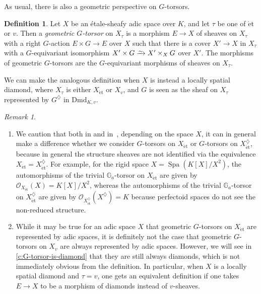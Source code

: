 \documentclass[10pt,a4paper]{article}
\theoremstyle{definition}
\newtheorem{Definition}[thm]{Definition}
\theoremstyle{remark}
\newtheorem{Remark}[thm]{Remark}
\newcommand*{\lowsim}{\vbox to 0pt{\vss\hbox{$\scriptstyle\sim$}\vskip-2pt}}
\newcommand*{\isomarrow}{\xrightarrow{\lowsim}}
\newcommand{\G}{\mathbb{G}}
\renewcommand{\O}{\mathcal{O}}
\newcommand{\Spa}{\operatorname{Spa}}
\newcommand{\et}{{\operatorname{\acute{e}t}}}
\newcommand{\Dmd}{\mathrm{Dmd}}
\numberwithin{equation}{section}
\begin{document}
As usual, there is also a geometric perspective on $G$-torsors. 

\begin{Definition}\label{d:geom-G-torsor} Let $X$ be an \'etale-sheafy adic space over $K$, and let $\tau$ be one of $\et$ or $v$.
	Then a \emph{geometric $G$-torsor} on $X_{\tau}$ is a morphism $E\to X$ of sheaves on $X_\tau$ with a right $G$-action $E\times G\to E$ over $X$ such that there is a cover $X'\to X$ in $X_\tau$ with a $G$-equivariant isomorphism $X'\times G\isomarrow X'\times_XG$ over $X'$. The morphisms of geometric $G$-torsors are the $G$-equivariant morphisms of sheaves on $X_\tau$.
	
	We can make the analogous definition when $X$ is instead a locally spatial diamond, where $X_\tau$ is either $X_\et$ or $X_v$, and $G$ is seen as the sheaf on $X_\tau$ represented by $G^\diamondsuit$ in $\Dmd_{K,v}$.
\end{Definition}

\begin{Remark}\leavevmode
	\begin{enumerate}
		\item We caution that both in  and in~, depending on the space $X$, it can in general make a difference whether we consider $G$-torsors on $X_\et$ or $G$-torsors on $X^\diamondsuit_{\et}$, because in general the structure sheaves are not identified via the equivalence $X_\et=X^\diamondsuit_{\et}$. For example, for the rigid space $X=\Spa(K[X]/X^2)$, the automorphisms of the trivial $\G_a$-torsor on $X_\et$ are given by $\O_{X_\et}(X)=K[X]/X^2$, whereas the automorphisms of the trivial $\G_a$-torsor on $X^\diamondsuit_\et$ are given by $\O_{X^\diamondsuit_\et}(X^\diamondsuit)=K$ because perfectoid spaces do not see the non-reduced structure.
		
	\item While it may be true for an adic space $X$ that geometric $G$-torsors on $X_{\et}$ are represented by adic spaces, it is definitely not the case that  geometric $G$-torsors on $X_{v}$ are always represented by adic spaces. However, we will see in \cref{c:G-torsor-is-diamond} that they are still always diamonds, which is not immediately obvious from the definition. In particular, when $X$ is a locally spatial diamond and $\tau=v$, one gets an equivalent definition if one takes $E\to X$ to be a morphism of diamonds instead of $v$-sheaves.
	\end{enumerate}
\end{Remark}
\end{document}
